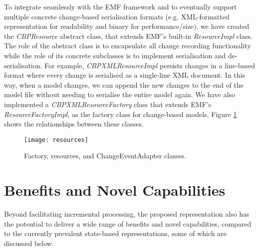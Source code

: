 To integrate seamlessly with the EMF framework and to eventually support multiple concrete change-based serialisation formats (e.g. XML-formatted representation for readability and binary for performance/size), we have created the \emph{CBPResource} abstract class, that extends EMF's built-in \emph{ResourceImpl} class. The role of the abstract class is to encapsulate all change recording functionality while the role of its concrete subclasses is to implement serialisation and de-serialisation. For example, \emph{CBPXMLResourceImpl} persists changes in a line-based format where every change is serialised as a single-line XML document. In this way, when a model changes, we can append the new changes to the end of the model file without needing to serialise the entire model again. We have also implemented a \emph{CBPXMLResourceFactory} class that extends EMF's \emph{ResourceFactoryImpl}, as the factory class for change-based models. Figure \ref{fig:resources} shows the relationships between these classes.



\begin{figure}[th]
    \centering
    \texttt{[image: resources]}
    \caption{Factory, resources, and ChangeEventAdapter classes.}
    \label{fig:resources}
\end{figure}

\section{Benefits and Novel Capabilities}
\label{sec:benefits_and_novel_capabilities}
Beyond facilitating incremental processing, the proposed representation also has the potential to deliver a wide range of benefits and novel capabilities, compared to the currently prevalent state-based representations, some of which are discussed below.


